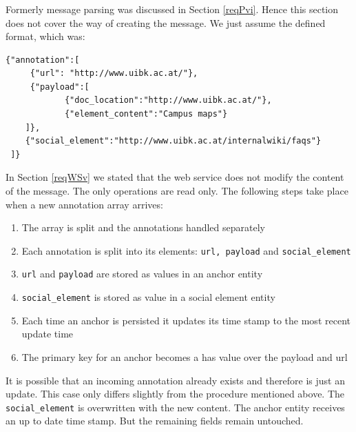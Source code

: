 \subsubsection[Message Parsing]{\reqWSvi}\label{reqWSvi}

Formerly message parsing was discussed in Section \ref{reqPvi}. Hence this section does
 not
 cover the way of creating the message. We just assume the defined format, which was:
\begin{lstlisting}
{"annotation":[
	 {"url": "http://www.uibk.ac.at/"},
	 {"payload":[
 			{"doc_location":"http://www.uibk.ac.at/"},
 			{"element_content":"Campus maps"}
 	]},
 	{"social_element":"http://www.uibk.ac.at/internalwiki/faqs"}
 ]}
\end{lstlisting}

In Section \ref{reqWSv} we stated that the web service does
 not
 modify the content of the message. The only operations are read only. The following steps take place when a new annotation array arrives:

\begin{enumerate}
	\item The array is split and the annotations handled separately 
	\item Each annotation is split into its elements: \verb^url, payload^ and \verb^social_element^
	\item \verb^url^ and \verb^payload^ are stored as values in an anchor entity
	\item \verb^social_element^ is stored as value in a social element entity
	\item Each time an anchor is persisted it updates its time stamp to the most recent update time
	\item The primary key for an anchor becomes a has value over the payload and url
\end{enumerate}

It is possible that an incoming annotation already exists and therefore is just an update. This case only differs slightly from the procedure mentioned above. The \verb^social_element^ is overwritten with the new content. The anchor entity receives an up to date time stamp. But the remaining fields remain untouched. 

